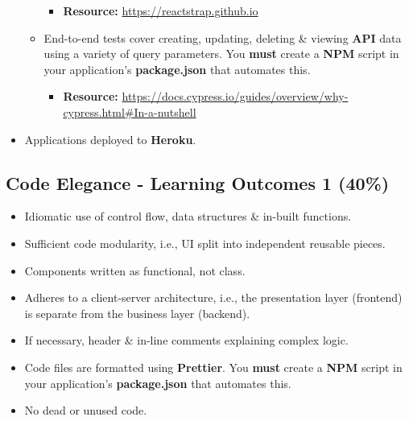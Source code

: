 \documentclass{article}
\begin{document}
\begin{itemize}
\begin{itemize}
		\begin{itemize}
			\item \textbf{Resource:} \footnotesize\href{https://reactstrap.github.io}{https://reactstrap.github.io}
		\end{itemize}
		\item End-to-end tests cover creating, updating, deleting \& viewing \textbf{API} data using a variety of query parameters. You \textbf{must} create a \textbf{NPM} script in your application's \textbf{package.json} that automates this.
		\begin{itemize}
			\item \textbf{Resource:} \footnotesize\href{https://docs.cypress.io/guides/overview/why-cypress.html#In-a-nutshell}{https://docs.cypress.io/guides/overview/why-cypress.html\#In-a-nutshell}
		\end{itemize}
	\end{itemize}
	\item Applications deployed to \textbf{Heroku}.
\end{itemize}

\subsection*{Code Elegance - Learning Outcomes 1 (40\%)}
\begin{itemize}
	\item Idiomatic use of control flow, data structures \& in-built functions.
	\item Sufficient code modularity, i.e., UI split into independent reusable pieces.
	\item Components written as functional, not class.
	\item Adheres to a client-server architecture, i.e., the presentation layer (frontend) is separate from the business layer (backend).
	\item If necessary, header \& in-line comments explaining complex logic.
	\item Code files are formatted using \textbf{Prettier}. You \textbf{must} create a \textbf{NPM} script in your application's \textbf{package.json} that automates this.
	\item No dead or unused code.
\end{itemize}
\end{document}
